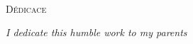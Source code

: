 \begin{center}
                \vspace{.3cm}\\
                \textsc{\Large Dédicace}\\

		\vspace{2cm}
		\textit{I dedicate this humble work to my parents}


		\newpage
\end{center}

